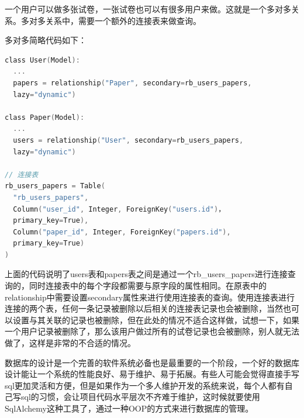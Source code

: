 一个用户可以做多张试卷，一张试卷也可以有很多用户来做。这就是一个多对多关系。多对多关系中，需要一个额外的连接表来做查询。

多对多简略代码如下：
\begin{lstlisting}[language=C]
class User(Model):
  ...
  papers = relationship("Paper", secondary=rb_users_papers,
  lazy="dynamic")

class Paper(Model):
  ...
  users = relationship("User", secondary=rb_users_papers,
  lazy="dynamic")

// 连接表
rb_users_papers = Table(
  "rb_users_papers",
  Column("user_id", Integer, ForeignKey("users.id")，
  primary_key=True),
  Column("paper_id", Integer, ForeignKey("papers.id"),
  primary_key=True)
)
\end{lstlisting}

上面的代码说明了users表和papers表之间是通过一个rb\_users\_papers进行连接查询的，同时连接表中的每个字段都需要与原字段的属性相同。在原表中的relationship中需要设置secondary属性来进行使用连接表的查询。使用连接表进行连接的两个表，任何一条记录被删除以后相关的连接表记录也会被删除，当然也可以设置与其关联的记录也被删除，但在此处的情况不适合这样做，试想一下，如果一个用户记录被删除了，那么该用户做过所有的试卷记录也会被删除，别人就无法做了，这样是非常的不合适的情况。

数据库的设计是一个完善的软件系统必备也是最重要的一个阶段，一个好的数据库设计能让一个系统的性能良好、易于维护、易于拓展。有些人可能会觉得直接手写sql更加灵活和方便，但是如果作为一个多人维护开发的系统来说，每个人都有自己写sql的习惯，会让项目代码水平层次不齐难于维护，这时候就要使用SqlAlchemy这种工具了，通过一种OOP的方式来进行数据库的管理。